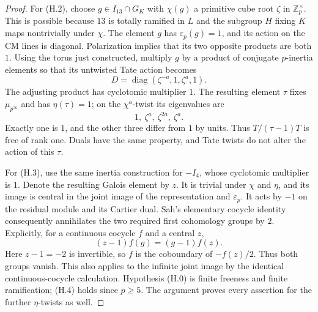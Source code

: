 \begin{proof}
For (H.2), choose $g\in I_{13}\cap G_K$ with $\chi(g)$ a primitive
cube root $\zeta$ in $\mathbb Z_p^\times$.  This is possible because
$13$ is totally ramified in $L$ and the subgroup $H$ fixing $K$
maps nontrivially under $\chi$.  The element $g$ has
$\varepsilon_p(g)=1$, and its action on the CM lines is diagonal.
Polarization implies that its two opposite products are both $1$.
Using the torus just constructed, multiply $g$ by a product of
conjugate $p$-inertia elements so that its untwisted Tate action becomes
\[
 D=\operatorname{diag}(\zeta^{-a},1,\zeta^{a},1).
\]
The adjusting product has cyclotomic multiplier $1$.  The resulting
element $\tau$ fixes $\mu_{p^\infty}$ and has $\eta(\tau)=1$;
on the $\chi^a$-twist its eigenvalues are
\[
 1,\ \zeta^a,\ \zeta^{2a},\ \zeta^a.
\]
Exactly one is $1$, and the other three differ from $1$ by units.
Thus $T/(\tau-1)T$ is free of rank one.  Duals have the same property,
and Tate twists do not alter the action of this $\tau$.

For (H.3), use the same inertia construction for $-I_4$, whose
cyclotomic multiplier is $1$.  Denote the resulting Galois element
by $z$.  It is trivial under $\chi$ and $\eta$, and its image is
central in the joint image of the representation and
$\varepsilon_p$.  It acts by $-1$ on the residual module and its
Cartier dual.  Sah's elementary cocycle identity consequently
annihilates the two required first cohomology groups by $2$.
Explicitly, for a continuous cocycle $f$ and a central $z$,
\[
 (z-1)f(g)=(g-1)f(z).
\]
Here $z-1=-2$ is invertible, so $f$ is the coboundary of
$-f(z)/2$.  Thus both groups vanish.  This also applies to the infinite
joint image by the identical continuous-cocycle calculation.
Hypothesis (H.0) is finite freeness and finite ramification; (H.4)
holds since $p\geq5$.  The argument proves every assertion for the
further $\eta$-twists as well.
\end{proof}


